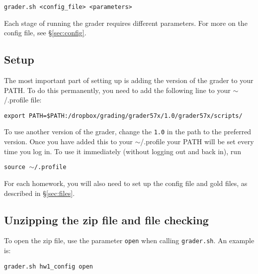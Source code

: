 \documentclass[12pt]{article}
\begin{document}
\vspace{5pt}

\texttt{grader.sh <config\_file> <parameters>}

\vspace{5pt}

\noindent Each stage of running the grader requires different parameters. For more on the config file, see \S\ref{sec:config}.

\subsection{Setup} \label{sec:setup}

The most important part of setting up is adding the version of the grader to your PATH. To do this permanently, you need to add the following line to your $\sim$/.profile file:

\vspace{5pt}

\texttt{export PATH=\$PATH:/dropbox/grading/grader57x/1.0/grader57x/scripts/}

\vspace{5pt}

To use another version of the grader, change the \texttt{1.0} in the path to the preferred version. Once you have added this to your $\sim$/.profile your PATH will be set every time you log in. To use it immediately (without logging out and back in), run

\vspace{5pt}

\texttt{source $\sim$/.profile}

\vspace{5pt}

For each homework, you will also need to set up the config file and gold files, as described in \S\ref{sec:files}.

\subsection{Unzipping the zip file and file checking} \label{sec:unzipping}

To open the zip file, use the parameter \texttt{open} when calling \texttt{grader.sh}. An example is:

\vspace{5pt}

\texttt{grader.sh hw1\_config open}

\vspace{5pt}
\end{document}
